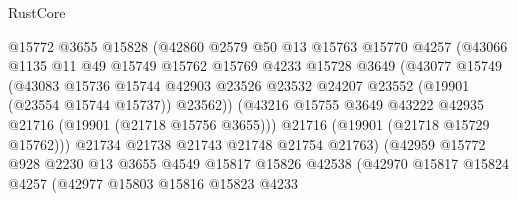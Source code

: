 \begin{lexlean}{RustCore}
\begin{coremodule}
                            @15772
                            @3655
                            @15828
                            (@42860
                              @2579
                              @50
                              @13
                              @15763
                              @15770
                              @4257
                              (@43066
                                @1135
                                @11
                                @49
                                @15749
                                @15762
                                @15769
                                @4233
                                @15728
                                @3649
                                (@43077
                                  @15749
                                  (@43083
                                    @15736
                                    @15744
                                    @42903
                                    @23526
                                    @23532
                                    @24207
                                    @23552
                                    (@19901 (@23554 @15744 @15737))
                                    @23562))
                                (@43216
                                  @15755
                                  @3649
                                  @43222
                                  @42935
                                  @21716
                                  (@19901 (@21718 @15756 @3655)))
                                @21716
                                (@19901 (@21718 @15729 @15762)))
                              @21734
                              @21738
                              @21743
                              @21748
                              @21754
                              @21763)
                            (@42959
                              @15772
                              @928
                              @2230
                              @13
                              @3655
                              @4549
                              @15817
                              @15826
                              @42538
                              (@42970
                                @15817
                                @15824
                                @4257
                                (@42977
                                  @15803
                                  @15816
                                  @15823
                                  @4233

\end{coremodule}
\end{lexlean}
